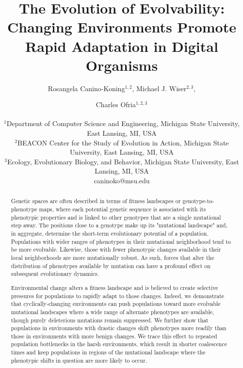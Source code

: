 \documentclass[letterpaper]{article}
\title{The Evolution of Evolvability: Changing Environments Promote Rapid Adaptation in Digital Organisms}
\author{Rosangela Canino-Koning$^{1,2}$, Michael J. Wiser$^{2,3}$, \and Charles Ofria$^{1,2,3}$ \\
\mbox{}\\
$^{1}$Department of Computer Science and Engineering, Michigan State University, East Lansing, MI, USA \\
$^{2}$BEACON Center for the Study of Evolution in Action, Michigan State University, East Lansing, MI, USA \\
$^{3}$Ecology, Evolutionary Biology, and Behavior, Michigan State University, East Lansing, MI, USA\\
caninoko@msu.edu}
\begin{document}
\maketitle

\begin{abstract}
Genetic spaces are often described in terms of fitness landscapes or genotype-to-phenotype maps, where each potential genetic sequence is associated with its phenotypic properties and is linked to other genotypes that are a single mutational step away.  The positions close to a genotype make up its "mutational landscape" and, in aggregate, determine the short-term evolutionary potential of a population.
Populations with wider ranges of phenotypes in their mutational neighborhood tend to be more evolvable. Likewise, those with fewer phenotypic changes available in their local neighborhoods are more mutationally robust.
%
%
%
As such, forces that alter the distribution of phenotypes available by mutation can have a profound effect on subsequent evolutionary dynamics.

Environmental change alters a fitness landscape and is believed to create selective pressures for populations to rapidly adapt to those changes.  Indeed, we demonstrate that cyclically-changing environments can push populations toward more evolvable mutational landscapes where a wide range of alternate phenotypes are available, though purely deleterious mutations remain suppressed. We further show that populations in environments with drastic changes shift phenotypes more readily than those in environments with more benign changes. We trace this effect to repeated population bottlenecks in the harsh environments, which result in shorter coalescence times and keep populations in regions of the mutational landscape where the phenotypic shifts in question are more likely to occur.
\end{abstract}
\end{document}
